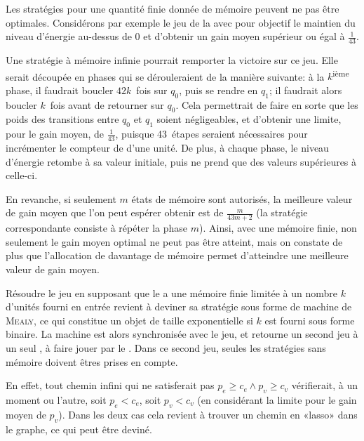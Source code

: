 \begin{remark}
Les stratégies pour une quantité finie donnée de mémoire peuvent ne pas être optimales.
Considérons par exemple le jeu de la  avec pour objectif le maintien du niveau d'énergie au-dessus de $0$ et d'obtenir un gain moyen supérieur ou égal à $\frac1{43}$.

Une stratégie à mémoire infinie pourrait remporter la victoire sur ce jeu.
Elle serait découpée en phases qui se dérouleraient de la manière suivante: à la $k$\textsuperscript{ième} phase, il faudrait boucler $42k$~fois sur $q_0$, puis se rendre en $q_1$; il faudrait alors boucler $k$~fois avant de retourner sur $q_0$.
Cela permettrait de faire en sorte que les poids des transitions entre $q_0$ et $q_1$ soient négligeables, et d'obtenir une limite, pour le gain moyen, de $\frac1{43}$, puisque 43~étapes seraient nécessaires pour incrémenter le compteur de  d'une unité.
De plus, à chaque phase, le niveau d'énergie retombe à sa valeur initiale, puis ne prend que des valeurs supérieures à celle-ci.

En revanche, si seulement $m$ états de mémoire sont autorisés, la meilleure valeur de gain moyen que l'on peut espérer obtenir est de $\frac{m}{43m+2}$ (la stratégie correspondante consiste à répéter la phase $m$).
Ainsi, avec une mémoire finie, non seulement le gain moyen optimal ne peut pas être atteint, mais on constate de plus que l'allocation de davantage de mémoire permet d'atteindre une meilleure valeur de gain moyen.
\end{remark}

Résoudre le jeu en supposant que le \jo a une mémoire finie limitée à un nombre $k$ d'unités fourni en entrée revient à deviner sa stratégie sous forme de machine de \textsc{Mealy}, ce qui constitue un objet de taille exponentielle si $k$ est fourni sous forme binaire.
La machine est alors synchronisée avec le jeu, et retourne un second jeu à un seul , à faire jouer par le \ji.
Dans ce second jeu, seules les stratégies sans mémoire doivent êtres prises en compte.

En effet, tout chemin infini qui ne satisferait pas $p_e \geq c_e \wedge p_v \geq c_v$ vérifierait, à un moment ou l'autre, soit $p_e < c_e$, soit $p_v < c_v$ (en considérant la limite pour le gain moyen de $p_v$).
Dans les deux cas cela revient à trouver un chemin en «lasso» dans le graphe, ce qui peut être deviné.

